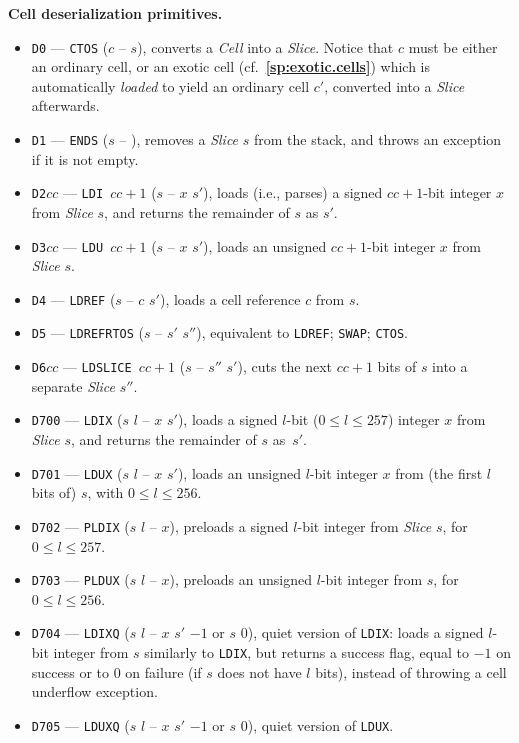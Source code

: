 \documentclass[12pt,oneside]{article}
\def\makepoint#1{\medbreak\noindent{\bf #1.\ }}
\def\nxsubpoint{\refstepcounter{subsubsection}%
    \smallbreak\makepoint{\thesubsubsection}}
\def\refpoint#1{{\rm\textbf{\ref{#1}}}}
\let\ptref=\refpoint
\def\emb#1{\textbf{#1.}}
\begin{document}
\nxsubpoint\emb{Cell deserialization primitives}\label{sp:prim.deser}
\begin{itemize}
\item {\tt D0} --- {\tt CTOS} ($c$ -- $s$), converts a {\em Cell\/} into a {\em Slice}. Notice that $c$ must be either an ordinary cell, or an exotic cell (cf.~\ptref{sp:exotic.cells}) which is automatically {\em loaded\/} to yield an ordinary cell $c'$, converted into a {\em Slice} afterwards.
\item {\tt D1} --- {\tt ENDS} ($s$ -- ), removes a {\em Slice\/} $s$ from the stack, and throws an exception if it is not empty.
\item {\tt D2$cc$} --- {\tt LDI $cc+1$} ($s$ -- $x$ $s'$), loads (i.e., parses) a signed $cc+1$-bit integer $x$ from {\em Slice\/} $s$, and returns the remainder of $s$ as $s'$.
\item {\tt D3$cc$} --- {\tt LDU $cc+1$} ($s$ -- $x$ $s'$), loads an unsigned $cc+1$-bit integer $x$ from {\em Slice\/} $s$.
\item {\tt D4} --- {\tt LDREF} ($s$ -- $c$ $s'$), loads a cell reference $c$ from $s$.
\item {\tt D5} --- {\tt LDREFRTOS} ($s$ -- $s'$ $s''$), equivalent to {\tt LDREF}; {\tt SWAP}; {\tt CTOS}.
\item {\tt D6$cc$} --- {\tt LDSLICE $cc+1$} ($s$ -- $s''$ $s'$), cuts the next $cc+1$ bits of $s$ into a separate {\em Slice\/} $s''$.
\item {\tt D700} --- {\tt LDIX} ($s$ $l$ -- $x$ $s'$), loads a signed $l$-bit ($0\leq l\leq 257$) integer $x$ from {\em Slice\/} $s$, and returns the remainder of $s$ as~$s'$.
\item {\tt D701} --- {\tt LDUX} ($s$ $l$ -- $x$ $s'$), loads an unsigned $l$-bit integer $x$ from (the first $l$ bits of) $s$, with $0\leq l\leq 256$.
\item {\tt D702} --- {\tt PLDIX} ($s$ $l$ -- $x$), preloads a signed $l$-bit integer from {\em Slice\/} $s$, for $0\leq l\leq 257$.
\item {\tt D703} --- {\tt PLDUX} ($s$ $l$ -- $x$), preloads an unsigned $l$-bit integer from $s$, for $0\leq l\leq 256$.
\item {\tt D704} --- {\tt LDIXQ} ($s$ $l$ -- $x$ $s'$ $-1$ or $s$ $0$), quiet version of {\tt LDIX}: loads a signed $l$-bit integer from $s$ similarly to {\tt LDIX}, but returns a success flag, equal to $-1$ on success or to $0$ on failure (if $s$ does not have $l$ bits), instead of throwing a cell underflow exception.
\item {\tt D705} --- {\tt LDUXQ} ($s$ $l$ -- $x$ $s'$ $-1$ or $s$ $0$), quiet version of {\tt LDUX}.

\end{itemize}
\end{document}
